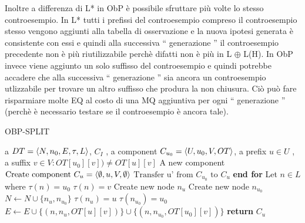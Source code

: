 Inoltre a differenza di L* in \ac{ObP} è possibile sfruttare più volte lo stesso controesempio. In L* tutti i prefissi del controesempio  compreso il controesempio stesso vengono aggiunti alla tabella di osservazione e la nuova ipotesi generata è consistente con essi e quindi alla successiva `` generazione  '' il controesempio precedente non è più riutilizzabile perchè difatti non è più in \ac{L} $\oplus$ L(\ac{H}). In \ac{ObP} invece viene aggiunto un solo suffisso del controesempio e quindi potrebbe accadere che alla successiva `` generazione  '' sia ancora un controesempio utlizzabile per trovare un altro suffisso che produra la non chiusura. Ciò può fare risparmiare molte \ac{EQ} al costo di una \ac{MQ} aggiuntiva per ogni `` generazione  '' (perchè è necessario testare se il controesempio è ancora tale).

\begin{algorithm}
\caption{OBP-SPLIT}\label{alg:split}
\begin{algorithmic}[1]
\Statex
\Input a $DT=\Braket{N,n_0,E,\tau,L}$, $C_I$ , a component $C_{u_{0}}=\Braket{U,u_0,V,OT}$, a prefix $u \in U$ , a suffix $v \in V : OT[u_0][v]) \neq OT[u][v]$
\Output A new component
\State $\text{Create component } C_u=\Braket{\emptyset,u,V,\emptyset}$
     \State $\text{Transfer u' from } C_{u_{0}} \text{ to } C_{u} $ 
     \EndIf
     \EndFor
     \State \textbf{end for}
      \State Let $n \in L$ where $\tau(n)=u_0$ 
      \State $\tau(n) = v$ 
      \State Create new node $n_u$
      \State Create new node $n_{u_{0}}$
      \State $N \gets N \cup \{n_u,n_{u_{0}}\}$
      \State $\tau(n_u) = u$
      \State $\tau(n_{u_{0}}) = u_0$
      \State $E \gets E \cup \{(n,n_u,OT[u][v])\} \cup \{(n,n_{u_{0}},OT[u_0][v])\}$
    \State \textbf{return} $C_u$
\end{algorithmic}
\end{algorithm}



